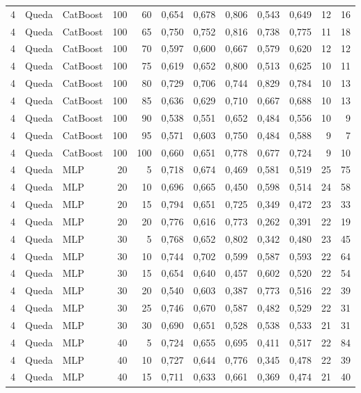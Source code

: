 \begin{longtable}{@{}rllrrrrrrrrr@{}}
4 & Queda & CatBoost & 100 & 60 & 0,654 & 0,678 & 0,806 & 0,543 & 0,649 & 12 & 16 \\
4 & Queda & CatBoost & 100 & 65 & 0,750 & 0,752 & 0,816 & 0,738 & 0,775 & 11 & 18 \\
4 & Queda & CatBoost & 100 & 70 & 0,597 & 0,600 & 0,667 & 0,579 & 0,620 & 12 & 12 \\
4 & Queda & CatBoost & 100 & 75 & 0,619 & 0,652 & 0,800 & 0,513 & 0,625 & 10 & 11 \\
4 & Queda & CatBoost & 100 & 80 & 0,729 & 0,706 & 0,744 & 0,829 & 0,784 & 10 & 13 \\
4 & Queda & CatBoost & 100 & 85 & 0,636 & 0,629 & 0,710 & 0,667 & 0,688 & 10 & 13 \\
4 & Queda & CatBoost & 100 & 90 & 0,538 & 0,551 & 0,652 & 0,484 & 0,556 & 10 & 9 \\
4 & Queda & CatBoost & 100 & 95 & 0,571 & 0,603 & 0,750 & 0,484 & 0,588 & 9 & 7 \\
4 & Queda & CatBoost & 100 & 100 & 0,660 & 0,651 & 0,778 & 0,677 & 0,724 & 9 & 10 \\
4 & Queda & MLP & 20 & 5 & 0,718 & 0,674 & 0,469 & 0,581 & 0,519 & 25 & 75 \\
4 & Queda & MLP & 20 & 10 & 0,696 & 0,665 & 0,450 & 0,598 & 0,514 & 24 & 58 \\
4 & Queda & MLP & 20 & 15 & 0,794 & 0,651 & 0,725 & 0,349 & 0,472 & 23 & 33 \\
4 & Queda & MLP & 20 & 20 & 0,776 & 0,616 & 0,773 & 0,262 & 0,391 & 22 & 19 \\
4 & Queda & MLP & 30 & 5 & 0,768 & 0,652 & 0,802 & 0,342 & 0,480 & 23 & 45 \\
4 & Queda & MLP & 30 & 10 & 0,744 & 0,702 & 0,599 & 0,587 & 0,593 & 22 & 64 \\
4 & Queda & MLP & 30 & 15 & 0,654 & 0,640 & 0,457 & 0,602 & 0,520 & 22 & 54 \\
4 & Queda & MLP & 30 & 20 & 0,540 & 0,603 & 0,387 & 0,773 & 0,516 & 22 & 39 \\
4 & Queda & MLP & 30 & 25 & 0,746 & 0,670 & 0,587 & 0,482 & 0,529 & 22 & 31 \\
4 & Queda & MLP & 30 & 30 & 0,690 & 0,651 & 0,528 & 0,538 & 0,533 & 21 & 31 \\
4 & Queda & MLP & 40 & 5 & 0,724 & 0,655 & 0,695 & 0,411 & 0,517 & 22 & 84 \\
4 & Queda & MLP & 40 & 10 & 0,727 & 0,644 & 0,776 & 0,345 & 0,478 & 22 & 39 \\
4 & Queda & MLP & 40 & 15 & 0,711 & 0,633 & 0,661 & 0,369 & 0,474 & 21 & 40 \\

\end{longtable}
